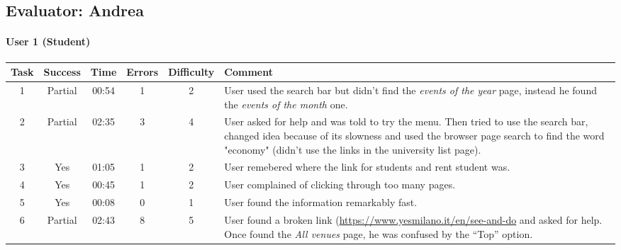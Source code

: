 \begin{small}
\pagebreak

\subsection{Evaluator: Andrea}

\paragraph{User 1 (Student)}
\begin{tabularx}{\linewidth}{c c c c c X}
    \toprule
    \textbf{Task} & \textbf{Success} & \textbf{Time}
     & \textbf{Errors} & \textbf{Difficulty} & \textbf{Comment} \\
    \midrule
    1 & Partial & 00:54 & 1 & 2 & User used the search bar but didn't find the \emph{events of the year} page, instead he found the \emph{events of the month} one. \\ \midrule
    2 & Partial & 02:35 & 3 & 4 & User asked for help and was told to try the menu. Then tried to use the search bar, changed idea because of its slowness and used the browser page search to find the word "economy" (didn't use the links in the university list page). \\ \midrule
    3 & Yes & 01:05 & 1 & 2 & User remebered where the link for students and rent student was. \\ \midrule
    4 & Yes & 00:45 & 1 & 2 & User complained of clicking through too many pages. \\ \midrule
    5 & Yes & 00:08 & 0 & 1 & User found the information remarkably fast. \\ \midrule
    6 & Partial & 02:43 & 8 & 5 & User found a broken link (\href{"Info on museums - art venues open"}{https://www.yesmilano.it/en/see-and-do} and asked for help. Once found the \emph{All venues} page, he was confused by the ``Top'' option. \\ \bottomrule
\end{tabularx}


\end{small}
